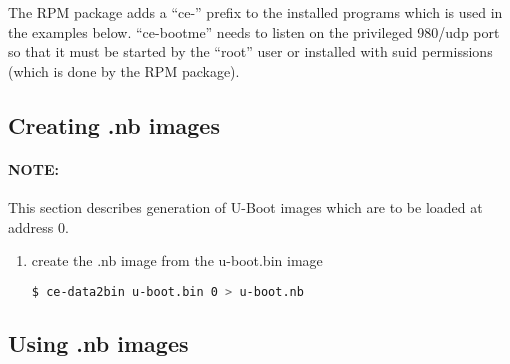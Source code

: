 The RPM package adds a ``ce-'' prefix to the installed programs which
is used in the examples below. ``ce-bootme'' needs to listen on the
privileged 980/udp port so that it must be started by the ``root''
user or installed with suid permissions (which is done by the RPM
package).

\subsection{Creating .nb images}

\paragraph{NOTE:} This section describes generation of U-Boot images
which are to be loaded at address 0.

\begin{enumerate}
\item create the .nb image from the u-boot.bin image
\begin{lstlisting}[language=sh]
$ ce-data2bin u-boot.bin 0 > u-boot.nb
\end{lstlisting}%
\end{enumerate}


\subsection{Using .nb images}

